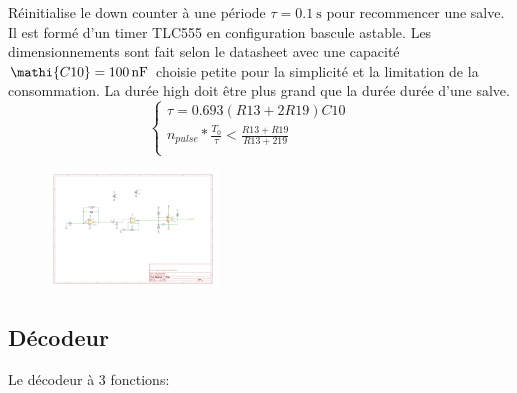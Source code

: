 \documentclass[french]{layout/Report}
\begin{document}
\begin{description}[leftmargin=!,labelwidth=3cm, labelindent=\parindent]
	\item[Burst timer] Réinitialise le down counter à une période $\tau = \SI{0.1}{\second}$ pour recommencer une salve. Il est formé d'un timer TLC555 en configuration bascule astable. Les dimensionnements sont fait selon le datasheet \cite{TLC555} avec une capacité $\mathi{C10} = \SI{100}{\nano F}$ choisie petite pour la simplicité et la limitation de la consommation. La durée high doit être plus grand que la durée durée d'une salve.
		\begin{equation*}
			\begin{cases}
				\tau = 0.693(\mathit{R13}+2\mathit{R19})\mathit{C10} \\
				n_{pulse}*\frac{T_0}{\tau} < \frac{\mathit{R13}+\mathit{R19}}{\mathit{R13}+2\mathit{19}} \\
			\end{cases}
		\quad\
		\
	\end{equation*}

		\begin{figure}[H]
			\centering
			\includegraphics[width=0.4\textwidth]{fig/schmitt_trigger.pdf}
		\end{figure}
\end{description}

\subsection{Décodeur}
Le décodeur à 3 fonctions:
\end{document}
